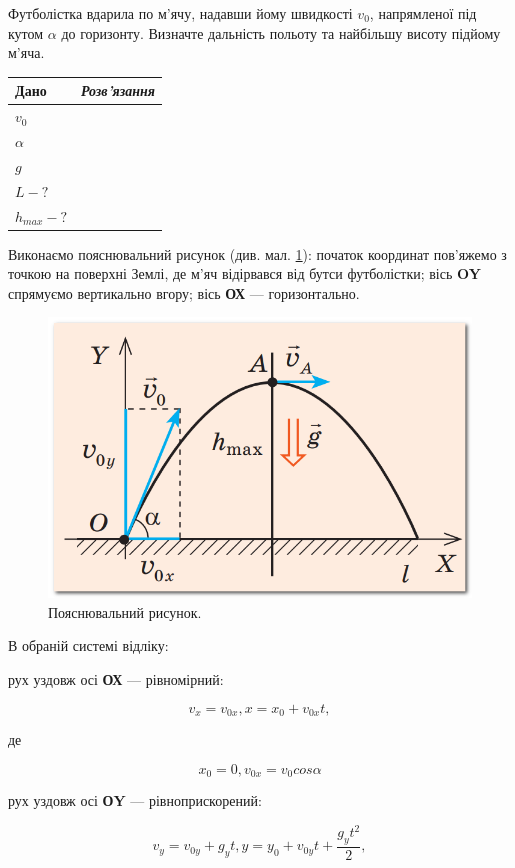 Футболістка вдарила по м’ячу, надавши йому швидкості $v_0$, напрямленої під кутом $\alpha$ до горизонту. Визначте дальність польоту та найбільшу висоту підйому м’яча.

\begin{center}
	\begin{tabular}{|l|l|} 
		\hline
		Дано & \textit{Розв'язання} \\
		\hline
		$v_0$ & \\
		$\alpha$ & \\
		$g$ & \\	
		\hline
		$L - ?$ & \\
		$h_{max} - ?$	& \\
		\hline
	\end{tabular}
\end{center}

Виконаємо пояснювальний рисунок (див. мал. \ref{fig:hit2}): початок координат пов’яжемо з точкою на поверхні Землі, де м’яч відірвався від бутси футболістки; вісь \textbf{OY} спрямуємо вертикально вгору; вісь \textbf{ОХ} — горизонтально.

\begin{figure}[h]
	\centering
	\includegraphics[width=0.6\linewidth]{./images-miziuk/hit2.png}
	\caption{
		\centering
		Пояснювальний рисунок.}
	\label{fig:hit2}
\end{figure}

В обраній системі відліку:

рух уздовж осі \textbf{ОХ} — рівномірний:

\begin{equation}\label{eq:hinteq1}
	v_x = v_{0x}, x = x_0 + v_{0x}t,
\end{equation}

де 

$$
	x_0 = 0, v_{0x} = v_0cos\alpha 
$$

рух уздовж осі \textbf{ОY} — рівноприскорений:

\begin{equation}\label{eq:hinteq2}
	v_y = v_{0y} + g_yt, y = y_0 + v_{0y}t + \dfrac{g_yt^2}{2},
\end{equation}


